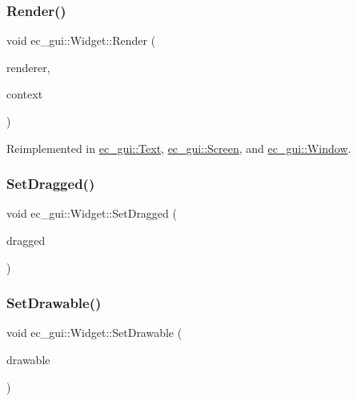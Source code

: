 \subsubsection{\texorpdfstring{Render()}{Render()}}
{\footnotesize\ttfamily void ec\+\_\+gui\+::\+Widget\+::\+Render (\begin{DoxyParamCaption}\item[{\mbox{\hyperlink{classec__gui_1_1_g_u_i_renderer}{G\+U\+I\+Renderer}} \&}]{renderer,  }\item[{\mbox{\hyperlink{classec__gui_1_1_g_u_i_rendering_context}{G\+U\+I\+Rendering\+Context}} \&}]{context }\end{DoxyParamCaption})\hspace{0.3cm}{\ttfamily [virtual]}}



Reimplemented in \mbox{\hyperlink{classec__gui_1_1_text_a3dab94a21f6fbe9d27f0591b5a5b196b}{ec\+\_\+gui\+::\+Text}}, \mbox{\hyperlink{classec__gui_1_1_screen_a8a1e8f2db412a40632c580c547861b52}{ec\+\_\+gui\+::\+Screen}}, and \mbox{\hyperlink{classec__gui_1_1_window_ab8c5a4f6f2104d7619f90362d0c43385}{ec\+\_\+gui\+::\+Window}}.

\mbox{\label{classec__gui_1_1_widget_ad9f31a52bf63294eb6c5cb260934bbfb}} 
\subsubsection{\texorpdfstring{Set\+Dragged()}{SetDragged()}}
{\footnotesize\ttfamily void ec\+\_\+gui\+::\+Widget\+::\+Set\+Dragged (\begin{DoxyParamCaption}\item[{const bool}]{dragged }\end{DoxyParamCaption})\hspace{0.3cm}{\ttfamily [virtual]}}

\mbox{\label{classec__gui_1_1_widget_a42018848fa3f427e8e360a07ee704c07}} 
\subsubsection{\texorpdfstring{Set\+Drawable()}{SetDrawable()}}
{\footnotesize\ttfamily void ec\+\_\+gui\+::\+Widget\+::\+Set\+Drawable (\begin{DoxyParamCaption}\item[{\mbox{\hyperlink{classec_1_1_drawable}{ec\+::\+Drawable}} $\ast$}]{drawable }\end{DoxyParamCaption})\hspace{0.3cm}{\ttfamily [virtual]}}


